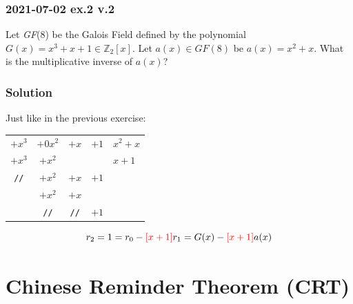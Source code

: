 \documentclass[11pt, a4paper]{article}
\newcommand{\gf}[1]{\textit{GF}(#1)}
\begin{document}
\newpage
\subsubsection{2021-07-02 ex.2 v.2}
Let \gf{8} be the Galois Field defined by the polynomial $G(x)=x^3+x+1\in\mathbb{Z}_2[x]$. Let $a(x)\in\gf{8}$ be $a(x)=x^2+x$. What is the multiplicative inverse of $a(x)$?
\subsubsection*{Solution}
Just like in the previous exercise:
\begin{center}
    \begin{tabular}{cccc|l}
         $+x^3$&$+0x^2$&$+x$&$+1$&$x^2+x$\\
         \cline{5-5}
         $+x^3$&$+x^2$&&&$x+1$\\
         \cline{1-4}
         \texttt{//}&$+x^2$&$+x$&$+1$&\\
         &$+x^2$&$+x$&&\\
         \cline{2-4}
         &\texttt{//}&\texttt{//}&$+1$&
    \end{tabular}
\end{center}
$$r_2=1=r_0-\textcolor{red}{[x+1]}r_1=G(x)-\textcolor{red}{[x+1]}a(x)$$

\newpage
\section{Chinese Reminder Theorem (CRT)}
\end{document}
